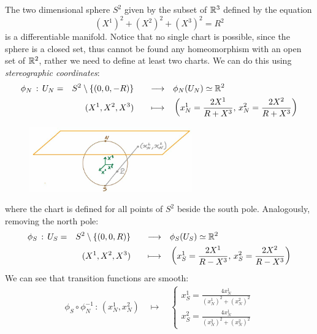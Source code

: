 \documentclass[../main/main.tex]{subfiles}
\begin{document}
\begin{example}[$S^2$]
The two dimensional sphere $S^2$ given by the subset of $\mathbb{R}^3$ defined by the equation
\[(X^1)^2+(X^2)^2+(X^3)^2=R^2\]
is a differentiable manifold. Notice that no single chart is possible, since the sphere is a closed set, thus cannot be found any homeomorphism with an open set of $\mathbb{R}^2$, rather we need to define at least two charts. We can do this using \emph{stereographic coordinates}:
\begin{alignat*}{4}
\phi_N\,:\,U_N=&&S^2\setminus\{(0,0,-R)\}&&\quad\longrightarrow\quad &\phi_N(U_N)\simeq\mathbb{R}^2\\
&&(X^1,X^2,X^3)&&\quad\longmapsto\quad&\left(x_N^1=\frac{2X^1}{R+X^3},\,x_N^2=\frac{2X^2}{R+X^3}\right)
\end{alignat*}
\begin{figure}[H]
\centering
\includegraphics[width=7cm]{../img/stereo-coord-2sphere.jpg}
\end{figure}
\noindent where the chart is defined for all points of $S^2$ beside the south pole. Analogously, removing the north pole:
\begin{alignat*}{4}
\phi_S\,:\,U_S=&&S^2\setminus\{(0,0,R)\}&&\quad\longrightarrow\quad &\phi_S(U_S)\simeq\mathbb{R}^2\\
&&(X^1,X^2,X^3)&&\quad\longmapsto\quad&\left(x_S^1=\frac{2X^1}{R-X^3},\,x_S^2=\frac{2X^2}{R-X^3}\right)
\end{alignat*}
We can see that transition functions are smooth:
\begin{align*}
\phi_S\circ\phi_N^{-1}\,:\,(x_N^1,x_N^2)\quad\longmapsto\quad	 \begin{cases}
x_S^1=\frac{4x_N^1}{(x_N^1)^2+(x_N^2)^2}\\
x_S^2=\frac{4x_N^1}{(x_N^2)^2+(x_N^2)^2}
\end{cases}
\end{align*}
\end{example}
\end{document}
